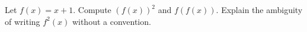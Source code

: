 Let $f(x)=x+1$. Compute $(f(x))^2$ and $f(f(x))$. Explain the ambiguity of writing $f^2(x)$ without a convention.
